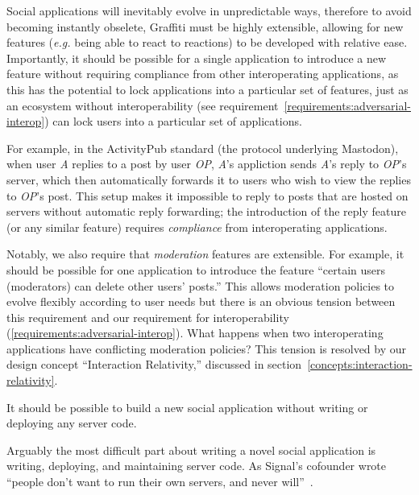 Social applications will inevitably evolve in unpredictable ways,
therefore to avoid becoming instantly obselete, Graffiti must be highly extensible,
allowing for new features (\emph{e.g.} being able to react to reactions)
to be developed with relative ease.
Importantly, it should be possible for a single application to introduce a new feature
without requiring compliance from other interoperating applications, as this has the potential to
lock applications into a particular set of features,
just as an ecosystem without interoperability (see requirement~\ref{requirements:adversarial-interop}) can lock users into a
particular set of applications.

For example, in the ActivityPub standard (the protocol underlying Mastodon),
when user \emph{A} replies to a post by user \emph{OP}, \emph{A}'s appliction
sends \emph{A}'s reply to \emph{OP}'s server, which then automatically forwards
it to users who wish to view the replies to \emph{OP}'s post.
This setup makes it impossible to reply to posts that are hosted on servers
without automatic reply forwarding;
the introduction of the reply feature (or any similar feature) requires \emph{compliance}
from interoperating applications.

Notably, we also require that \emph{moderation} features are extensible.
For example, it should be possible for one application to introduce the feature
``certain users (moderators) can delete other users' posts.''
This allows moderation policies to evolve flexibly according to user needs
but there is an obvious tension between this requirement
and our requirement for interoperability (\ref{requirements:adversarial-interop}).
What happens when two interoperating applications have conflicting moderation policies?
This tension is resolved by our design concept ``Interaction Relativity,''
discussed in section~\ref{concepts:interaction-relativity}.

\begin{requirement}[Serverless]
    It should be possible to build a new social application without writing or deploying any server code.
\end{requirement}

Arguably the most difficult part about writing a novel
social application is writing, deploying,
and maintaining server code.
As Signal's cofounder wrote
``people don’t want to run their own servers, and never will''~\cite{moxieweb3}.

